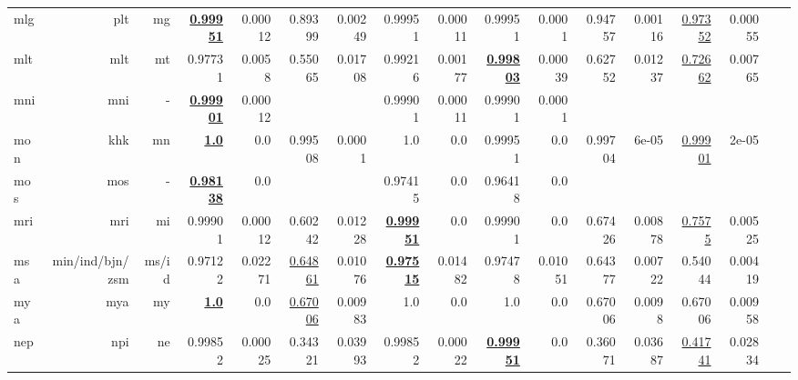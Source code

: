 \documentclass[11pt]{article}
\begin{document}
\begin{table*}[h]
{\begin{tabular}{lrrrrrrrrrrrrrrrr}
mlg         & plt         & mg         & \textbf{\underline{0.99951}}         & 0.00012         & 0.89399         & 0.00249         & 0.99951         & 0.00011         & 0.99951         & 0.0001         & 0.94757         & 0.00116         & \underline{0.97352}         & 0.00055         \\
mlt         & mlt         & mt         & 0.97731         & 0.0058         & 0.55065         & 0.01708         & 0.99216         & 0.00177         & \textbf{\underline{0.99803}}         & 0.00039         & 0.62752         & 0.01237         & \underline{0.72662}         & 0.00765         \\
mni         & mni         & -         & \textbf{\underline{0.99901}}         & 0.00012         &          &          & 0.99901         & 0.00011         & 0.99901         & 0.0001         &          &          &          &          \\
mon         & khk         & mn         & \textbf{\underline{1.0}}         & 0.0         & 0.99508         & 0.0001         & 1.0         & 0.0         & 0.99951         & 0.0         & 0.99704         & 6e-05         & \underline{0.99901}         & 2e-05         \\
mos         & mos         & -         & \textbf{\underline{0.98138}}         & 0.0         &          &          & 0.97415         & 0.0         & 0.96418         & 0.0         &          &          &          &          \\
mri         & mri         & mi         & 0.99901         & 0.00012         & 0.60242         & 0.01228         & \textbf{\underline{0.99951}}         & 0.0         & 0.99901         & 0.0         & 0.67426         & 0.00878         & \underline{0.7575}         & 0.00525         \\
msa         & min/ind/bjn/zsm         & ms/id         & 0.97122         & 0.02271         & \underline{0.64861}         & 0.01076         & \textbf{\underline{0.97515}}         & 0.01482         & 0.97478         & 0.01051         & 0.64377         & 0.00722         & 0.54044         & 0.00419         \\
mya         & mya         & my         & \textbf{\underline{1.0}}         & 0.0         & \underline{0.67006}         & 0.00983         & 1.0         & 0.0         & 1.0         & 0.0         & 0.67006         & 0.0098         & 0.67006         & 0.00958         \\
nep         & npi         & ne         & 0.99852         & 0.00025         & 0.34321         & 0.03993         & 0.99852         & 0.00022         & \textbf{\underline{0.99951}}         & 0.0         & 0.36071         & 0.03687         & \underline{0.41741}         & 0.02834         \\

\end{tabular}}
\end{table*}
\end{document}
